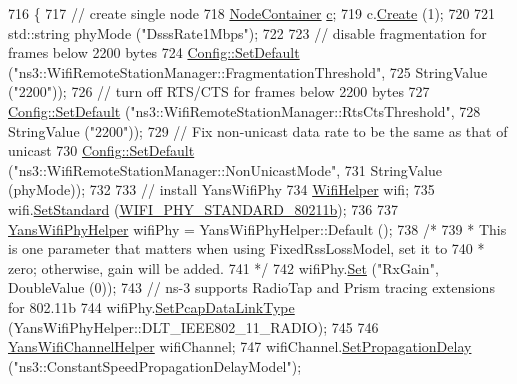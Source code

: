 \begin{DoxyCode}
716 \{
717   \textcolor{comment}{// create single node}
718   \hyperlink{classns3_1_1NodeContainer}{NodeContainer} \hyperlink{lte_2model_2fading-traces_2fading__trace__generator_8m_ae0323a9039add2978bf5b49550572c7c}{c};
719   c.\hyperlink{classns3_1_1NodeContainer_a787f059e2813e8b951cc6914d11dfe69}{Create} (1);
720 
721   std::string phyMode (\textcolor{stringliteral}{"DsssRate1Mbps"});
722 
723   \textcolor{comment}{// disable fragmentation for frames below 2200 bytes}
724   \hyperlink{group__config_ga2e7882df849d8ba4aaad31c934c40c06}{Config::SetDefault} (\textcolor{stringliteral}{"ns3::WifiRemoteStationManager::FragmentationThreshold"},
725                       StringValue (\textcolor{stringliteral}{"2200"}));
726   \textcolor{comment}{// turn off RTS/CTS for frames below 2200 bytes}
727   \hyperlink{group__config_ga2e7882df849d8ba4aaad31c934c40c06}{Config::SetDefault} (\textcolor{stringliteral}{"ns3::WifiRemoteStationManager::RtsCtsThreshold"},
728                       StringValue (\textcolor{stringliteral}{"2200"}));
729   \textcolor{comment}{// Fix non-unicast data rate to be the same as that of unicast}
730   \hyperlink{group__config_ga2e7882df849d8ba4aaad31c934c40c06}{Config::SetDefault} (\textcolor{stringliteral}{"ns3::WifiRemoteStationManager::NonUnicastMode"},
731                       StringValue (phyMode));
732 
733   \textcolor{comment}{// install YansWifiPhy}
734   \hyperlink{classns3_1_1WifiHelper}{WifiHelper} wifi;
735   wifi.\hyperlink{classns3_1_1WifiHelper_aa54f3e61527ef8de318d310045bc5dfd}{SetStandard} (\hyperlink{group__wifi_gga1299834f4e1c615af3ca738033b76a49a77e1cc9f77a0bce8e2bc82cbef437b5a}{WIFI\_PHY\_STANDARD\_80211b});
736 
737   \hyperlink{classns3_1_1YansWifiPhyHelper}{YansWifiPhyHelper} wifiPhy =  YansWifiPhyHelper::Default ();
738   \textcolor{comment}{/*}
739 \textcolor{comment}{   * This is one parameter that matters when using FixedRssLossModel, set it to}
740 \textcolor{comment}{   * zero; otherwise, gain will be added.}
741 \textcolor{comment}{   */}
742   wifiPhy.\hyperlink{classns3_1_1WifiPhyHelper_a2527d6d7b29f717fd7436166c5f05f1a}{Set} (\textcolor{stringliteral}{"RxGain"}, DoubleValue (0));
743   \textcolor{comment}{// ns-3 supports RadioTap and Prism tracing extensions for 802.11b}
744   wifiPhy.\hyperlink{classns3_1_1WifiPhyHelper_ae4b90e90f6e78a19c1b7fdf08b270218}{SetPcapDataLinkType} (YansWifiPhyHelper::DLT\_IEEE802\_11\_RADIO);
745 
746   \hyperlink{classns3_1_1YansWifiChannelHelper}{YansWifiChannelHelper} wifiChannel;
747   wifiChannel.\hyperlink{classns3_1_1YansWifiChannelHelper_a6b452ba53ccaee6ca000cc72ed9ea0fa}{SetPropagationDelay} (\textcolor{stringliteral}{"ns3::ConstantSpeedPropagationDelayModel"});

\end{DoxyCode}

